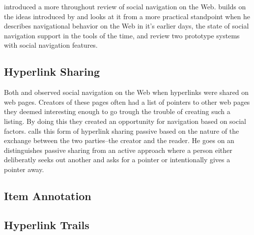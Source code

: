\citet{dieberger97} introduced a more throughout review of social navigation
on the Web. \citeauthor{dieberger97} builds on the ideas introduced by
\citeauthor{dourish94} and looks at it from a more practical standpoint when
he describes navigational behavior on the Web in it's earlier days, the state
of social navigation support in the tools of the time, and review two
prototype systems with social navigation features.


\subsection{Hyperlink Sharing}

Both \cite{dourish94} and \cite{dieberger97} observed social navigation on the
Web when hyperlinks were shared on web pages. Creators of these pages often
had a list of pointers to other web pages they deemed interesting enough to go
trough the trouble of creating such a listing. By doing this they created
an opportunity for navigation based on social factors.
\citeauthor{dieberger97} calls this form of hyperlink sharing passive
based on the nature of the exchange between the two parties--the creator and
the reader. He goes on an distinguishes passive sharing from an active
approach where a person either deliberatly seeks out another and asks for a
pointer or intentionally gives a pointer away.



\subsection{Item Annotation}

\subsection{Hyperlink Trails}

